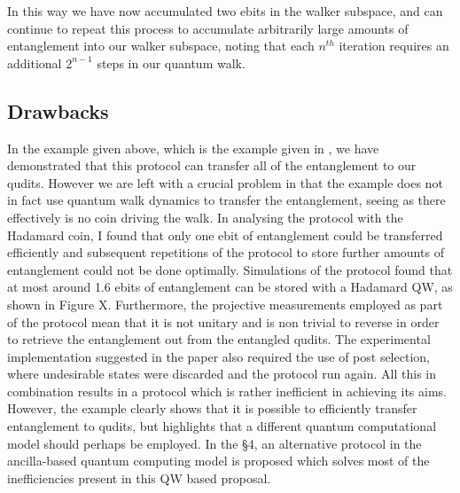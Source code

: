 In this way we have now accumulated two ebits in the walker subspace, and can continue to repeat this process to accumulate arbitrarily large amounts of entanglement into our walker subspace, noting that each $n^{th}$ iteration requires an additional $2^{n-1}$ steps in our quantum walk.

\subsection{Drawbacks}
In the example given above, which is the example given in \cite{giordani2020}, we have demonstrated that this protocol can transfer all of the entanglement to our qudits.
However we are left with a crucial problem in that the example does not in fact use quantum walk dynamics to transfer the entanglement, seeing as there effectively is no coin driving the walk.
In analysing the protocol with the Hadamard coin, I found that only one ebit of entanglement could be transferred efficiently and subsequent repetitions of the protocol to store further amounts of entanglement could not be done optimally.
Simulations of the protocol found that at most around 1.6 ebits of entanglement can be stored with a Hadamard QW, as shown in Figure X.
Furthermore, the projective measurements employed as part of the protocol mean that it is not unitary and is non trivial to reverse in order to retrieve the entanglement out from the entangled qudits.
The experimental implementation suggested in the paper also required the use of post selection, where undesirable states were discarded and the protocol run again.
All this in combination results in a protocol which is rather inefficient in achieving its aims.
However, the example clearly shows that it is possible to efficiently transfer entanglement to qudits, but highlights that a different quantum computational model should perhaps be employed.
In the \S{4}, an alternative protocol in the ancilla-based quantum computing model is proposed which solves most of the inefficiencies present in this QW based proposal.
